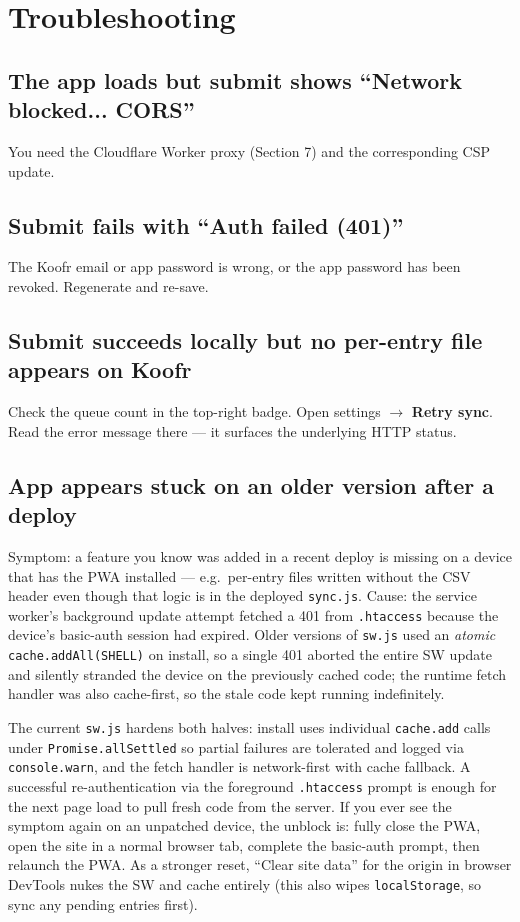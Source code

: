 \documentclass[11pt,a4paper]{article}
\begin{document}
\section{Troubleshooting}

\subsection*{The app loads but submit shows ``Network blocked... CORS''}
You need the Cloudflare Worker proxy (Section 7) and the corresponding CSP update.

\subsection*{Submit fails with ``Auth failed (401)''}
The Koofr email or app password is wrong, or the app password has been revoked. Regenerate and re-save.

\subsection*{Submit succeeds locally but no per-entry file appears on Koofr}
Check the queue count in the top-right badge. Open settings $\rightarrow$ \textbf{Retry sync}. Read the error message there --- it surfaces the underlying HTTP status.

\subsection*{App appears stuck on an older version after a deploy}
Symptom: a feature you know was added in a recent deploy is missing on a device that has the PWA installed --- e.g.\ per-entry files written without the CSV header even though that logic is in the deployed \texttt{sync.js}. Cause: the service worker's background update attempt fetched a 401 from \texttt{.htaccess} because the device's basic-auth session had expired. Older versions of \texttt{sw.js} used an \emph{atomic} \texttt{cache.addAll(SHELL)} on install, so a single 401 aborted the entire SW update and silently stranded the device on the previously cached code; the runtime fetch handler was also cache-first, so the stale code kept running indefinitely.

The current \texttt{sw.js} hardens both halves: install uses individual \texttt{cache.add} calls under \texttt{Promise.allSettled} so partial failures are tolerated and logged via \texttt{console.warn}, and the fetch handler is network-first with cache fallback. A successful re-authentication via the foreground \texttt{.htaccess} prompt is enough for the next page load to pull fresh code from the server. If you ever see the symptom again on an unpatched device, the unblock is: fully close the PWA, open the site in a normal browser tab, complete the basic-auth prompt, then relaunch the PWA. As a stronger reset, ``Clear site data'' for the origin in browser DevTools nukes the SW and cache entirely (this also wipes \texttt{localStorage}, so sync any pending entries first).
\end{document}
